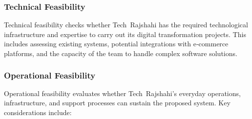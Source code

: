 \documentclass[12pt,a4paper]{article}
\begin{document}
\subsubsection{Technical Feasibility}
Technical feasibility checks whether Tech Rajshahi has the required technological infrastructure and expertise to carry out its digital transformation projects.  This includes assessing existing systems, potential integrations with e‑commerce platforms, and the capacity of the team to handle complex software solutions.

\subsubsection{Operational Feasibility}
Operational feasibility evaluates whether Tech Rajshahi’s everyday operations, infrastructure, and support processes can sustain the proposed system. Key considerations include:
\end{document}
